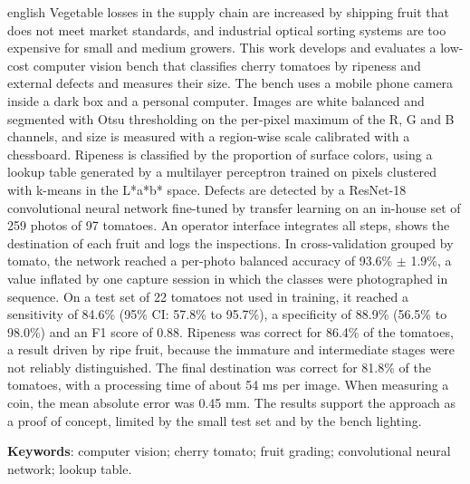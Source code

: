 \begin{resumo}[Abstract]
	\SingleSpacing
	\begin{otherlanguage*}{english}
		Vegetable losses in the supply chain are increased by shipping fruit that does not meet market standards, and industrial optical sorting systems are too expensive for small and medium growers. This work develops and evaluates a low-cost computer vision bench that classifies cherry tomatoes by ripeness and external defects and measures their size. The bench uses a mobile phone camera inside a dark box and a personal computer. Images are white balanced and segmented with Otsu thresholding on the per-pixel maximum of the R, G and B channels, and size is measured with a region-wise scale calibrated with a chessboard. Ripeness is classified by the proportion of surface colors, using a lookup table generated by a multilayer perceptron trained on pixels clustered with k-means in the L*a*b* space. Defects are detected by a ResNet-18 convolutional neural network fine-tuned by transfer learning on an in-house set of 259 photos of 97 tomatoes. An operator interface integrates all steps, shows the destination of each fruit and logs the inspections. In cross-validation grouped by tomato, the network reached a per-photo balanced accuracy of 93.6\% $\pm$ 1.9\%, a value inflated by one capture session in which the classes were photographed in sequence. On a test set of 22 tomatoes not used in training, it reached a sensitivity of 84.6\% (95\% CI: 57.8\% to 95.7\%), a specificity of 88.9\% (56.5\% to 98.0\%) and an F1 score of 0.88. Ripeness was correct for 86.4\% of the tomatoes, a result driven by ripe fruit, because the immature and intermediate stages were not reliably distinguished. The final destination was correct for 81.8\% of the tomatoes, with a processing time of about 54 ms per image. When measuring a coin, the mean absolute error was 0.45 mm. The results support the approach as a proof of concept, limited by the small test set and by the bench lighting.

		\textbf{Keywords}: computer vision; cherry tomato; fruit grading; convolutional neural network; lookup table.
	\end{otherlanguage*}
\end{resumo}

% 
%
%  

